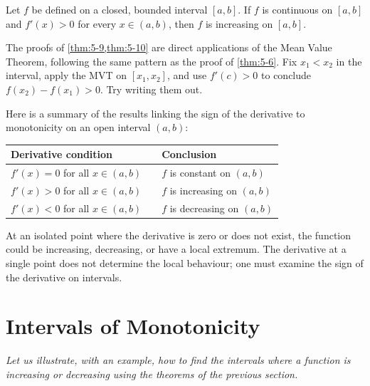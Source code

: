 \begin{theorem}
\label{thm:5-10}
Let $f$ be defined on a closed, bounded interval $[a,b]$.  If $f$ is continuous on $[a,b]$ and $f'(x) > 0$ for every $x \in (a,b)$, then $f$ is increasing on $[a,b]$.
\end{theorem}

\begin{remark}
The proofs of \cref{thm:5-9,thm:5-10} are direct applications of the Mean Value Theorem, following the same pattern as the proof of \cref{thm:5-6}.  Fix $x_{1} < x_{2}$ in the interval, apply the MVT on $[x_{1}, x_{2}]$, and use $f'(c) > 0$ to conclude $f(x_{2}) - f(x_{1}) > 0$.  Try writing them out.
\end{remark}

Here is a summary of the results linking the sign of the derivative to monotonicity on an open interval $(a,b)$:

\begin{center}
\begin{tabular}{lcl}
  \toprule
  \textbf{Derivative condition} && \textbf{Conclusion} \\
  \midrule
  $f'(x) = 0$ for all $x \in (a,b)$   && $f$ is constant on $(a,b)$ \\
  $f'(x) > 0$ for all $x \in (a,b)$   && $f$ is increasing on $(a,b)$ \\
  $f'(x) < 0$ for all $x \in (a,b)$   && $f$ is decreasing on $(a,b)$ \\
  \bottomrule
\end{tabular}
\end{center}

At an isolated point where the derivative is zero or does not exist, the function could be increasing, decreasing, or have a local extremum.  The derivative at a single point does not determine the local behaviour; one must examine the sign of the derivative on intervals.

\section{Intervals of Monotonicity}
\label{sec:5.12}

\textit{Let us illustrate, with an example, how to find the intervals where a function is increasing or decreasing using the theorems of the previous section.}

